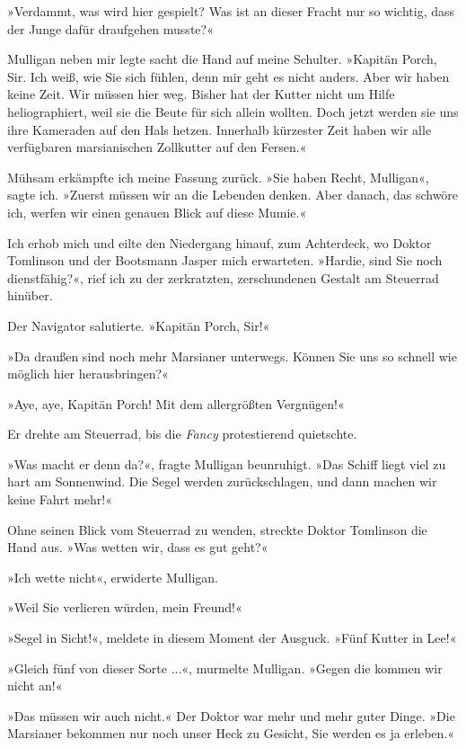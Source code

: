 »Verdammt, was wird hier gespielt? Was ist an dieser Fracht nur so
wichtig, dass der Junge dafür draufgehen musste?«

Mulligan neben mir legte sacht die Hand auf meine Schulter.
»Kapitän Porch, Sir. Ich weiß, wie Sie sich fühlen, denn mir geht
es nicht anders. Aber wir haben keine Zeit. Wir müssen hier weg.
Bisher hat der Kutter nicht um Hilfe heliographiert, weil sie die
Beute für sich allein wollten. Doch jetzt werden sie uns ihre
Kameraden auf den Hals hetzen. Innerhalb kürzester Zeit haben wir
alle verfügbaren marsianischen Zollkutter auf den Fersen.«

Mühsam erkämpfte ich meine Fassung zurück. »Sie haben Recht,
Mulligan«, sagte ich. »Zuerst müssen wir an die Lebenden denken.
Aber danach, das schwöre ich, werfen wir einen genauen Blick auf
diese Mumie.«

\bigpar

Ich erhob mich und eilte den Niedergang hinauf, zum Achterdeck, wo
Doktor Tomlinson und der Bootsmann Jasper mich erwarteten. »Hardie,
sind Sie noch dienstfähig?«, rief ich zu der zerkratzten,
zerschundenen Gestalt am Steuerrad hinüber.

Der Navigator salutierte. »Kapitän Porch, Sir!«

»Da draußen sind noch mehr Marsianer unterwegs. Können Sie uns so
schnell wie möglich hier herausbringen?«

»Aye, aye, Kapitän Porch! Mit dem allergrößten Vergnügen!«

Er drehte am Steuerrad, bis die \emph{Fancy} protestierend
quietschte.

»Was macht er denn da?«, fragte Mulligan beunruhigt. »Das Schiff
liegt viel zu hart am Sonnenwind. Die Segel werden zurückschlagen,
und dann machen wir keine Fahrt mehr!«

Ohne seinen Blick vom Steuerrad zu wenden, streckte Doktor
Tomlinson die Hand aus. »Was wetten wir, dass es gut geht?«

»Ich wette nicht«, erwiderte Mulligan.

»Weil Sie verlieren würden, mein Freund!«

»Segel in Sicht!«, meldete in diesem Moment der Ausguck. »Fünf
Kutter in Lee!«

»Gleich fünf von dieser Sorte ...«, murmelte Mulligan. »Gegen die
kommen wir nicht an!«

»Das müssen wir auch nicht.« Der Doktor war mehr und mehr guter
Dinge. »Die Marsianer bekommen nur noch unser Heck zu Gesicht, Sie
werden es ja erleben.«

